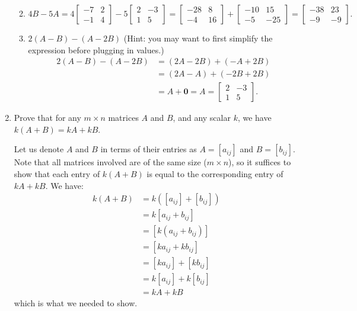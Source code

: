 \documentclass[12pt]{article}
\newcommand{\bbm}{\begin{bmatrix}}
\newcommand{\ebm}{\end{bmatrix}}
\begin{document}
\begin{enumerate}
\begin{enumerate}
\bigskip


 \item $4B-5A = 4\bbm -7 & 2\\-1&4\ebm - 5\bbm 2&-3\\1&5\ebm  = \bbm -28&8\\-4&16\ebm+\bbm-10&15\\-5&-25\ebm = \bbm -38&23\\-9&-9\ebm.$

 \item $2(A-B)-(A-2B)$ (Hint: you may want to first simplify the expression before plugging in values.)
\begin{align*}
 2(A-B)-(A-2B) &= (2A-2B)+(-A+2B)\\
& = (2A-A)+(-2B+2B)\\
& = A+\mathbf{0} = A = \bbm 2&-3\\1&5\ebm.
\end{align*}

\end{enumerate}
\newpage

 \item Prove that for any $m\times n$ matrices $A$ and $B$, and any scalar $k$, we have $k(A+B)=kA+kB$.

\bigskip

Let us denote $A$ and $B$ in terms of their entries as $A=[a_{ij}]$ and $B=[b_{ij}]$. Note that all matrices involved are of the same size ($m\times n$), so it suffices to show that each entry of $k(A+B)$ is equal to the corresponding entry of $kA+kB$. We have:
\begin{align*}
 k(A+B) & = k([a_{ij}]+[b_{ij}]) \tag*{Substituting notation}\\
& = k[a_{ij}+b_{ij}] \tag*{Definition of matrix addition}\\
& = [k(a_{ij}+b_{ij})] \tag*{Definition of scalar multiplication}\\
& = [ka_{ij} + kb_{ij}] \tag*{Distributive property for real numbers}\\
& = [ka_{ij}] + [kb_{ij}] \tag*{Definition of matrix addition}\\
& = k[a_{ij}]+k[b_{ij}] \tag*{Definition of scalar multiplication}\\
& = kA+kB \tag*{Substituting notation,}
\end{align*}
which is what we needed to show.


\end{enumerate}
\end{document}
